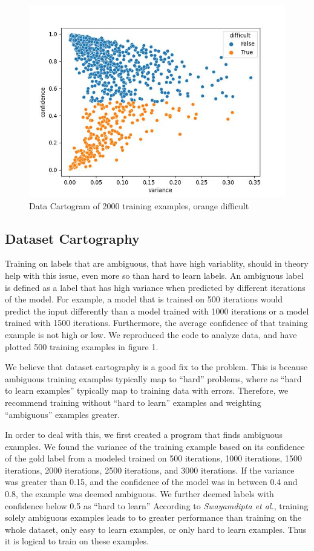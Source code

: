 \documentclass[twocolumn]{article}
\begin{document}
\begin{figure}
  \includegraphics[width=\linewidth]{./difficult.jpg}
  \caption{Data Cartogram of 2000 training examples, orange difficult}
  \label{}
\end{figure}

\subsection{Dataset Cartography}

Training on labels that are ambiguous, that have high variablity, should in
theory help with this issue, even more so than hard to learn labels. An
ambiguous label is defined as a label that has high variance when predicted by
different iterations of the model. For example, a model that is trained on 500
iterations would predict the input differently than a model trained with 1000
iterations or a model trained with 1500 iterations. Furthermore, the average
confidence of that training example is not high or low.
\cite{swayamdipta2020dataset} We reproduced the code to analyze data, and have
plotted 500 training examples in figure 1. 

We believe that dataset cartography is a good fix to the problem. This is
because ambiguous training examples typically map to \enquote{hard} problems,
where as \enquote{hard to learn examples} typically map to training data with
errors. Therefore, we recommend training without \enquote{hard to learn}
examples and weighting \enquote{ambiguous} examples greater.

In order to deal with this, we first created a program that finds ambiguous
examples. We found the variance of the training example based on its confidence
of the gold label from a modeled trained on 500 iterations, 1000 iterations,
1500 iterations, 2000 iterations, 2500 iterations, and 3000 iterations. If the
variance was greater than 0.15, and the confidence of the model was in between
0.4 and 0.8, the example was deemed ambiguous. We further deemed labels with
confidence below 0.5 as \enquote{hard to learn} According to \textit{Swayamdipta
et al.}, training solely ambiguous examples leads to to greater performance than
training on the whole dataset, only easy to learn examples, or only hard to
learn examples. Thus it is logical to train on these examples. 
\end{document}
